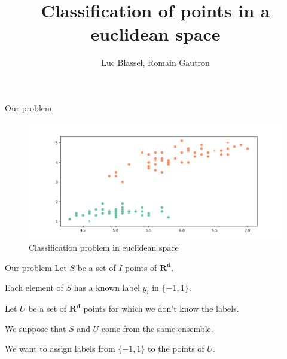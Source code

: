 \documentclass[11 pt]{beamer}
\title{Classification of points in a euclidean space}
\author{Luc Blassel, Romain Gautron}
\begin{document}
\maketitle

\begin{frame}{Our problem}
	\begin{figure}
		\centering
		\includegraphics[width=\textwidth]{figures/irisClass.png}
		\caption{Classification problem in euclidean space}
		\label{fig:iris}
	\end{figure}
\end{frame}
%

\begin{frame}{Our problem}
	Let $S$ be a set of $I$ points of $\mathbf{R^d}$.

	\medskip

	Each element of $S$ has a known label $y_i$ in $\{-1,1\}$.

	\medskip

	Let $U$ be a set of $\mathbf{R^d}$ points  for which we don't know the labels.

	\medskip

	We suppose that $S$ and $U$ come from the same ensemble.

	\medskip

	We want to assign labels from $\{-1,1\}$ to the points of $U$.

\end{frame}
%
\end{document}

